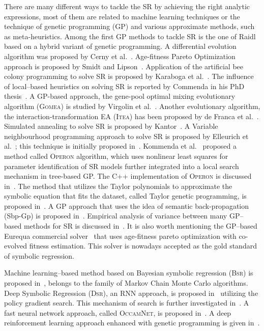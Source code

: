 \documentclass[a4paper,12pt]{elsarticle}
\begin{document}
	There are many different ways to tackle the SR by achieving the right analytic expressions, most of them are related to machine learning techniques or the technique of genetic programming (GP) and various approximate methods, such as meta-heuristics. Among the first GP methods to tackle SR is the one of Raidl~\cite{raidl1998hybrid} based on a hybrid variant of genetic programming. A differential evolution algorithm was proposed by Cerny et al.~\cite{cerny2008using}. Age-fitness Pareto Optimization approach is proposed by Smidt and Lipson~\cite{schmidt2010age}.  Application of the artificial bee colony programming to solve SR is proposed by Karaboga et al.~\cite{karaboga2012artificial}. 
	The influence of local--based heuristics on solving SR is reported by Commenda in his PhD thesis~\cite{kommenda2018local}. A  GP-based approach, the gene-pool optimal mixing evolutionary algorithm (\textsc{Gomea}) is studied by Virgolin et al.~\cite{virgolin2021improving}.  Another evolutionary algorithm, the interaction-transformation EA (\textsc{Itea}) has been proposed by de Franca et al.~\cite{de2021interaction}. Simulated annealing to solve SR is proposed by Kantor~\cite{kantor2021simulated}. A Variable neighbourhood programming approach to solve SR  is proposed by Elleurich et al.~\cite{elleuch2020variable}; this technique is initially proposed in~\cite{elleuch2016variable}. 
	Kommenda et al.~\cite{kommenda2020parameter} proposed a method called \textsc{Operon} algorithm, which uses nonlinear least squares for parameter identification of SR models further integrated into a local search mechanism in tree-based GP. The C++ implementation of \textsc{Operon} is discussed in~\cite{burlacu2020operon}. The method that utilizes the Taylor polynomials to approximate the symbolic equation that fits the dataset, called Taylor genetic programming, is proposed in~\cite{he2022taylor}. A GP approach that uses the idea of semantic back-propagation (Sbp-Gp) is proposed in~\cite{virgolin2019linear}.   Empirical analysis of variance between many GP--based methods for SR is discussed in~\cite{kammerer2021empirical}. It is also worth mentioning the GP--based Eurequa commercial solver~\cite{schmidt2009distilling, schmidt2011machine} that uses age-fitness pareto optimization with co-evolved fitness estimation. This solver is nowadays accepted as the gold standard of symbolic regression. 	  
	
	
	Machine learning--based method based on Bayesian symbolic regression (\textsc{Bsr}) is proposed in~\cite{jin2019bayesian},  belongs to the family of Markov Chain Monte Carlo algorithms. Deep Symbolic Regression (\textsc{Dsr}), an RNN approach, is proposed in~\cite{petersen2019deep} utilizing the policy gradient search. This mechanism of search is further investigated in~\cite{landajuela2021improving}. A fast neural network approach, called \textsc{OccamNet},  is proposed in~\cite{costa2020fast}.  A deep reinforcement learning approach enhanced with genetic programming is given in~\cite{mundhenk2021symbolic}. 
	
\end{document}
